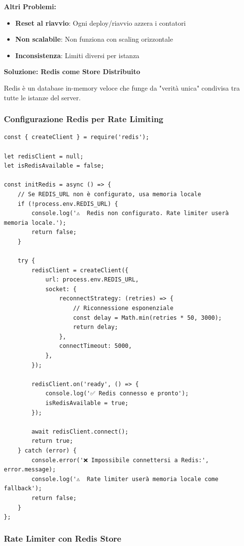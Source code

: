 \documentclass[11pt,a4paper]{article}
\begin{document}
\textbf{Altri Problemi:}
\begin{itemize}
    \item \textbf{Reset al riavvio}: Ogni deploy/riavvio azzera i contatori
    \item \textbf{Non scalabile}: Non funziona con scaling orizzontale
    \item \textbf{Inconsistenza}: Limiti diversi per istanza
\end{itemize}

\textbf{Soluzione: Redis come Store Distribuito}

Redis è un database in-memory veloce che funge da "verità unica" condivisa tra tutte le istanze del server.

\subsubsection{Configurazione Redis per Rate Limiting}

\begin{lstlisting}[caption=Configurazione Redis]
const { createClient } = require('redis');

let redisClient = null;
let isRedisAvailable = false;

const initRedis = async () => {
    // Se REDIS_URL non è configurato, usa memoria locale
    if (!process.env.REDIS_URL) {
        console.log('⚠️  Redis non configurato. Rate limiter userà memoria locale.');
        return false;
    }

    try {
        redisClient = createClient({
            url: process.env.REDIS_URL,
            socket: {
                reconnectStrategy: (retries) => {
                    // Riconnessione esponenziale
                    const delay = Math.min(retries * 50, 3000);
                    return delay;
                },
                connectTimeout: 5000,
            },
        });

        redisClient.on('ready', () => {
            console.log('✅ Redis connesso e pronto');
            isRedisAvailable = true;
        });

        await redisClient.connect();
        return true;
    } catch (error) {
        console.error('❌ Impossibile connettersi a Redis:', error.message);
        console.log('⚠️  Rate limiter userà memoria locale come fallback');
        return false;
    }
};
\end{lstlisting}

\subsubsection{Rate Limiter con Redis Store}
\end{document}
